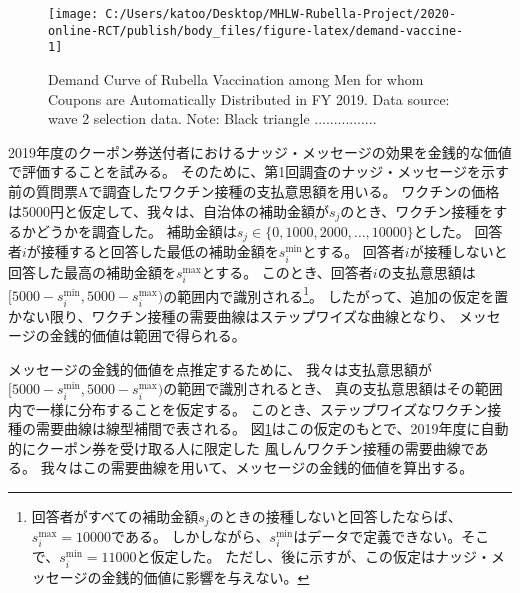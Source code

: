 \documentclass[
  11pt,
  a4paper,
]{article}
\begin{document}
\begin{figure}[t]
\texttt{[image: C:/Users/katoo/Desktop/MHLW-Rubella-Project/2020-online-RCT/publish/body\_files/figure-latex/demand-vaccine-1]} \caption{Demand Curve of Rubella Vaccination among Men for whom Coupons are Automatically Distributed in FY 2019. Data source: wave 2 selection data. Note: Black triangle ................}\label{fig:demand-vaccine}
\end{figure}

2019年度のクーポン券送付者におけるナッジ・メッセージの効果を金銭的な価値で評価することを試みる。
そのために、第1回調査のナッジ・メッセージを示す前の質問票Aで調査したワクチン接種の支払意思額を用いる。
ワクチンの価格は5000円と仮定して、我々は、自治体の補助金額が\(s_j\)のとき、ワクチン接種をするかどうかを調査した。
補助金額は\(s_j \in \{0, 1000, 2000, \ldots, 10000\}\)とした。
回答者\(i\)が接種すると回答した最低の補助金額を\(s_i^{\text{min}}\)とする。
回答者\(i\)が接種しないと回答した最高の補助金額を\(s_i^{\text{max}}\)とする。
このとき、回答者\(i\)の支払意思額は
\([5000 - s_i^{\text{min}}, 5000 - s_i^{\text{max}})\)の範囲内で識別される\footnote{回答者がすべての補助金額\(s_j\)のときの接種しないと回答したならば、\(s_i^{\text{max}} = 10000\)である。
  しかしながら、\(s_i^{\text{min}}\)はデータで定義できない。そこで、\(s_i^{\text{min}} = 11000\)と仮定した。
  ただし、後に示すが、この仮定はナッジ・メッセージの金銭的価値に影響を与えない。}。
したがって、追加の仮定を置かない限り、ワクチン接種の需要曲線はステップワイズな曲線となり、
メッセージの金銭的価値は範囲で得られる。

メッセージの金銭的価値を点推定するために、
我々は支払意思額が\([5000 - s_i^{\text{min}}, 5000 - s_i^{\text{max}})\)の範囲で識別されるとき、
真の支払意思額はその範囲内で一様に分布することを仮定する。
このとき、ステップワイズなワクチン接種の需要曲線は線型補間で表される。
図\ref{fig:demand-vaccine}はこの仮定のもとで、2019年度に自動的にクーポン券を受け取る人に限定した
風しんワクチン接種の需要曲線である。
我々はこの需要曲線を用いて、メッセージの金銭的価値を算出する。
\end{document}
